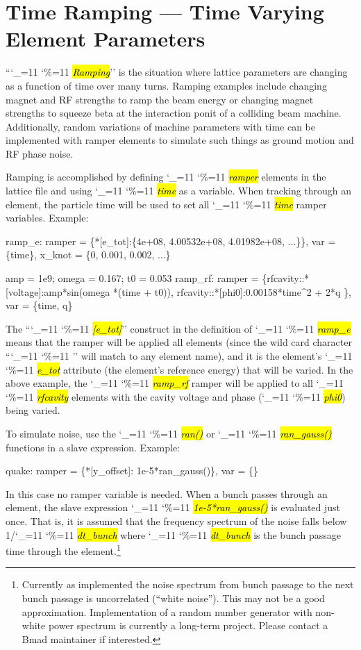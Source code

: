 \documentclass{hitec}
\newcommand\dottcmd[1]{\hl{\em#1}\endgroup}
\newcommand{\vn}{\begingroup\catcode`\_=11 \catcode`\%=11 \dottcmd}
\newcommand{\Section}[1]{\section{#1}\vspace*{-1ex}}
\begin{document}
{{{{{{{{{{{{{{%
\Section{Time Ramping --- Time Varying Element Parameters}
\label{s:ramp}

``\vn{Ramping}'' is the situation where lattice parameters are changing as a function of time over
many turns. Ramping examples include changing magnet and RF strengths to ramp the beam energy or
changing magnet strengths to squeeze beta at the interaction ponit of a colliding beam
machine. Additionally, random variations of machine parameters with time can be implemented with
ramper elements to simulate such things as ground motion and RF phase noise.

Ramping is accomplished by defining \vn{ramper} elements in the lattice file and using \vn{time} as
a variable. When tracking through an element, the particle time will be used to set all \vn{time}
ramper variables. Example:
\begin{code}
ramp_e: ramper = \{*[e_tot]:\{4e+08, 4.00532e+08, 4.01982e+08, ...\}\},
              var = \{time\}, x_knot = \{0, 0.001, 0.002, ...\}

amp = 1e9;  omega = 0.167;  t0 = 0.053
ramp_rf: ramper = \{rfcavity::*[voltage]:amp*sin(omega *(time + t0)),
      rfcavity::*[phi0]:0.00158*time^2 + 2*q \}, var = \{time, q\}
\end{code}
The ``\vn{*[e_tot]}'' construct in the definition of \vn{ramp_e} means that the ramper will be
applied all elements (since the wild card character ``\vn{*}'' will match to any element name), and
it is the element's \vn{e_tot} attribute (the element's reference energy) that will be varied.
In the above example, the \vn{ramp_rf} ramper will be applied to all \vn{rfcavity} elements with
the cavity voltage and phase (\vn{phi0}) being varied.

To simulate noise, use the \vn{ran()} or \vn{ran_gauss()} functions in a slave expression. Example:
\begin{code}
  quake: ramper = \{*[y_offset]: 1e-5*ran_gauss()\}, var = \{\}
\end{code}
In this case no ramper variable is needed. 
When a bunch passes through an element, the slave expression \vn{1e-5*ran_gauss()} is evaluated just
once. That is, it is assumed that the frequency spectrum of the noise falls below 1/\vn{dt_bunch}
where \vn{dt_bunch} is the bunch passage time through the element.\footnote
  {
Currently as implemented the noise spectrum from bunch passage to the next bunch passage is
uncorrelated (``white noise''). This may not be a good approximation. Implementation of a random
number generator with non-white power spectrum is currently a long-term project. Please contact a
Bmad maintainer if interested.
  }

}}}}}}}}}}}}}}
\end{document}
